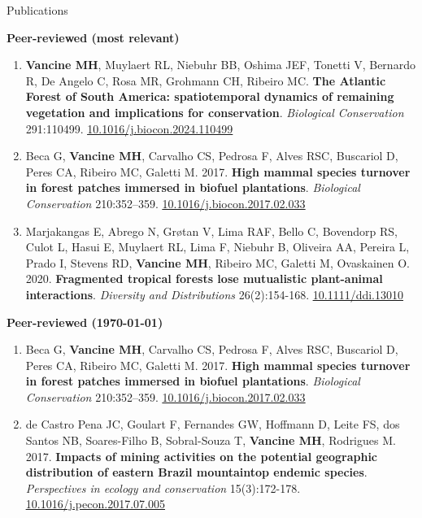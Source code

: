 \documentclass{resume}
\begin{document}
\begin{rSection}{Publications}

{\bf Peer-reviewed (most relevant)}

\begin{enumerate} 

\item {\bf Vancine MH}, Muylaert RL, Niebuhr BB, Oshima JEF, Tonetti V, Bernardo R, De Angelo C, Rosa MR, Grohmann CH, Ribeiro MC. {\bf The Atlantic Forest of South America: spatiotemporal dynamics of remaining vegetation and implications for conservation}. {\it Biological Conservation} 291:110499. \href{https://doi.org/10.1016/j.biocon.2024.110499}{\underline{10.1016/j.biocon.2024.110499}}

\item Beca G, {\bf Vancine MH}, Carvalho CS, Pedrosa F, Alves RSC, Buscariol D, Peres CA, Ribeiro MC, Galetti M. 2017. {\bf High mammal species turnover in forest patches immersed in biofuel plantations}. {\it Biological Conservation} 210:352–359. \href{https://doi.org/10.1016/j.biocon.2017.02.033}{\underline{10.1016/j.biocon.2017.02.033}}

\item Marjakangas E, Abrego N, Grøtan V, Lima RAF, Bello C, Bovendorp RS, Culot L, Hasui E, Muylaert RL, Lima F, Niebuhr B, Oliveira AA, Pereira L, Prado I, Stevens RD, {\bf Vancine MH}, Ribeiro MC, Galetti M, Ovaskainen O. 2020. {\bf Fragmented tropical forests lose mutualistic plant-animal interactions}. {\it Diversity and Distributions} 26(2):154-168. \href{https://doi.org/10.1111/ddi.13010}{\underline{10.1111/ddi.13010}}

\end{enumerate} 

{\bf Peer-reviewed (\today)}

\begin{enumerate} 
\item Beca G, {\bf Vancine MH}, Carvalho CS, Pedrosa F, Alves RSC, Buscariol D, Peres CA, Ribeiro MC, Galetti M. 2017. {\bf High mammal species turnover in forest patches immersed in biofuel plantations}. {\it Biological Conservation} 210:352–359. \href{https://doi.org/10.1016/j.biocon.2017.02.033}{\underline{10.1016/j.biocon.2017.02.033}}

\item de Castro Pena JC, Goulart F, Fernandes GW, Hoffmann D, Leite FS, dos Santos NB, Soares-Filho B, Sobral-Souza T, {\bf Vancine MH}, Rodrigues M. 2017. {\bf Impacts of mining activities on the potential geographic distribution of eastern Brazil mountaintop endemic species}. {\it Perspectives in ecology and conservation} 15(3):172-178. \href{https://doi.org/10.1016/j.pecon.2017.07.005}{\underline{10.1016/j.pecon.2017.07.005}}


\end{enumerate}
\end{rSection}
\end{document}
